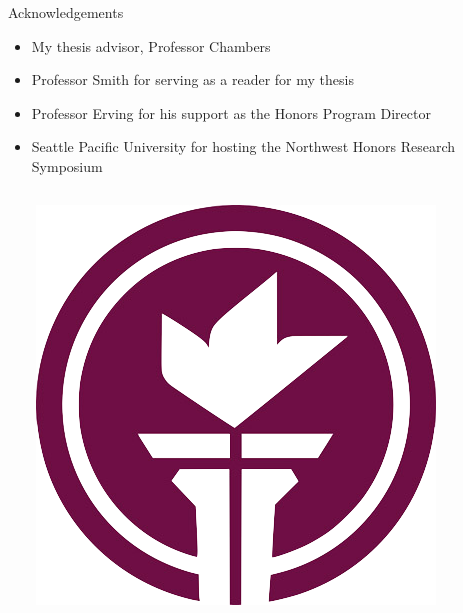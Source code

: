 \appendix

\begin{frame}{Acknowledgements}
\begin{itemize}
\item My thesis advisor, Professor Chambers
\item Professor Smith for serving as a reader for my thesis
\item Professor Erving for his support as the Honors Program Director
\item Seattle Pacific University for hosting the Northwest Honors Research Symposium
\end{itemize}
\begin{columns}[T,onlytextwidth]
\column{\textwidth}
\begin{minipage}[]{0.15\textwidth}
~
\end{minipage}%
\begin{minipage}[]{0.3\textwidth}
    \begin{centering}
    \includegraphics[width = \textwidth]{img/SPUTorch_208_LR}
    \end{centering}
\end{minipage}%
\begin{minipage}[]{0.1\textwidth}
~
\end{minipage}%
\begin{minipage}[]{0.3\textwidth}

\end{minipage}
\end{columns}
\end{frame}
